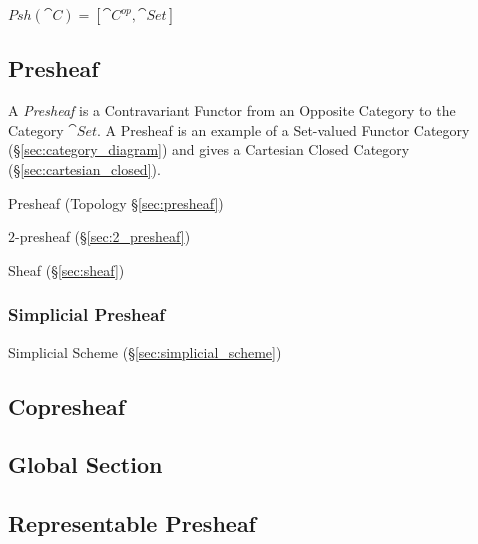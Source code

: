 $Psh(\cat{C}) = [\cat{C}^{op},\cat{Set}]$



\subsection{Presheaf}\label{sec:category_presheaf}

A \emph{Presheaf} is a Contravariant Functor from an Opposite Category to the
Category $\cat{Set}$. A Presheaf is an example of a Set-valued Functor Category
(\S\ref{sec:category_diagram}) and gives a Cartesian Closed Category
(\S\ref{sec:cartesian_closed}).

Presheaf (Topology \S\ref{sec:presheaf})

$2$-presheaf (\S\ref{sec:2_presheaf})

Sheaf (\S\ref{sec:sheaf})



\subsubsection{Simplicial Presheaf}\label{sec:simplicial_presheaf}

Simplicial Scheme (\S\ref{sec:simplicial_scheme})



\subsection{Copresheaf}\label{sec:copresheaf}

\subsection{Global Section}\label{sec:global_section}

\subsection{Representable Presheaf}\label{sec:representable_presheaf}

